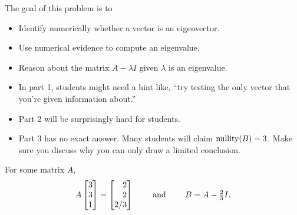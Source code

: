\documentclass{problemset}
\newcommand{\bookonlynewpage}{\begin{bookonly}\newpage\end{bookonly}}
\begin{document}
	\bookonlynewpage
	\question
	\begin{annotation}
		\begin{goals}

			The goal of this problem is to
			\begin{itemize}
				\item Identify numerically whether a vector is an eigenvector.
				\item Use numerical evidence to compute an eigenvalue.
				\item Reason about the matrix $A-\lambda I$ given $\lambda$ is an eigenvalue.
			\end{itemize}
		\end{goals}

		\begin{notes}
			\begin{itemize}
				\item In part 1, students might need a hint like, ``try testing the only vector
					that you're given information about.''
				\item Part 2 will be surprisingly hard for students.
				\item Part 3 has no exact answer. Many students will claim $\operatorname{nullity}(B)=3$.
					Make sure you discuss why you can only draw a limited conclusion.
			\end{itemize}
		\end{notes}
	\end{annotation}
	For some matrix $A$,
	\vspace{-.2cm}
	\[
		A\mat{3\\3\\1}=\mat{2\\2\\2/3}\qquad\text{ and }\qquad B=A-\tfrac{2}{3}I.
	\]
	\vspace{-.4cm}
\end{document}
